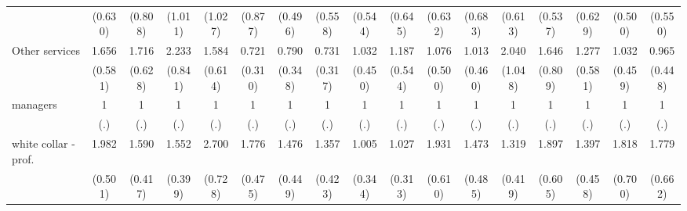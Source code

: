{\begin{tabular}{l*{16}{c}}
                    &     (0.630)         &     (0.808)         &     (1.011)         &     (1.027)         &     (0.877)         &     (0.496)         &     (0.558)         &     (0.544)         &     (0.645)         &     (0.632)         &     (0.683)         &     (0.613)         &     (0.537)         &     (0.629)         &     (0.500)         &     (0.550)         \\
[1em]
Other services      &       1.656         &       1.716         &       2.233\sym{*}  &       1.584         &       0.721         &       0.790         &       0.731         &       1.032         &       1.187         &       1.076         &       1.013         &       2.040         &       1.646         &       1.277         &       1.032         &       0.965         \\
                    &     (0.581)         &     (0.628)         &     (0.841)         &     (0.614)         &     (0.310)         &     (0.348)         &     (0.317)         &     (0.450)         &     (0.544)         &     (0.500)         &     (0.460)         &     (1.048)         &     (0.809)         &     (0.581)         &     (0.459)         &     (0.448)         \\
[1em]
managers            &           1         &           1         &           1         &           1         &           1         &           1         &           1         &           1         &           1         &           1         &           1         &           1         &           1         &           1         &           1         &           1         \\
                    &         (.)         &         (.)         &         (.)         &         (.)         &         (.)         &         (.)         &         (.)         &         (.)         &         (.)         &         (.)         &         (.)         &         (.)         &         (.)         &         (.)         &         (.)         &         (.)         \\
[1em]
white collar - prof.&       1.982\sym{**} &       1.590         &       1.552         &       2.700\sym{***}&       1.776\sym{*}  &       1.476         &       1.357         &       1.005         &       1.027         &       1.931\sym{*}  &       1.473         &       1.319         &       1.897\sym{*}  &       1.397         &       1.818         &       1.779         \\
                    &     (0.501)         &     (0.417)         &     (0.399)         &     (0.728)         &     (0.475)         &     (0.449)         &     (0.423)         &     (0.344)         &     (0.313)         &     (0.610)         &     (0.485)         &     (0.419)         &     (0.605)         &     (0.458)         &     (0.700)         &     (0.662)         \\

\end{tabular}}
